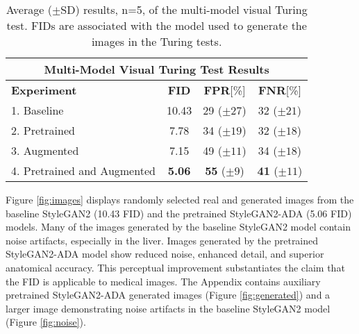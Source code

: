 \documentclass[runningheads]{llncs}
\begin{document}
\begin{table}
    \centering
    \caption{Average ($\pm$SD) results, n=5, of the multi-model visual Turing test. FIDs are associated with the model used to generate the images in the Turing tests.}
        \begin{tabular}{|l|c|c|c|}
            \multicolumn{4}{c}{\textbf{Multi-Model Visual Turing Test Results}} \\
            \hline
            \textbf{Experiment}
                &\textbf{FID}
                &\textbf{FPR}[\%]
                &\textbf{FNR}[\%]\\
            \hline
            1. Baseline 
                & 10.43
                & 29 ($\pm 27$)
                & 32 ($\pm 21$)\\
            \hline
            2. Pretrained
                & 7.78
                & 34 ($\pm 19$)
                & 32 ($\pm 18$)\\
            \hline
            3. Augmented
                & 7.15
                & 49 ($\pm 11$)
                & 34 ($\pm 18$)\\
            \hline
            4. Pretrained and Augmented
                &\textbf{5.06}
                &\textbf{55} ($\pm 9$)
                &\textbf{41} ($\pm 11$)\\
            \hline
        \end{tabular}

    \label{tab:fid_fpr}
\end{table}

Figure \ref{fig:images} displays randomly selected real and generated images from the baseline StyleGAN2 (10.43 FID) and the pretrained StyleGAN2-ADA (5.06 FID) models.
Many of the images generated by the baseline StyleGAN2 model contain noise artifacts, especially in the liver.
Images generated by the pretrained StyleGAN2-ADA model show reduced noise, enhanced detail, and superior anatomical accuracy.
This perceptual improvement substantiates the claim that the FID is applicable to medical images.
The Appendix contains auxiliary pretrained StyleGAN2-ADA generated images (Figure \ref{fig:generated}) and a larger image demonstrating noise artifacts in the baseline StyleGAN2 model (Figure \ref{fig:noise}).
\end{document}
